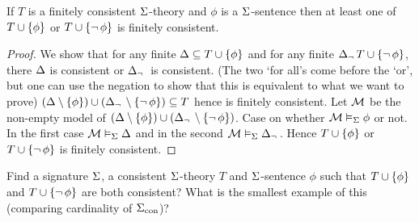 \begin{lem}
    If $T$ is a finitely consistent $\Sigma$-theory 
    and $\phi$ is a $\Sigma$-sentence then at least one of
    $T \cup \left\{\phi\right\}$ or $T \cup \left\{\neg\, \phi\right\}$ is finitely consistent.
\end{lem}
\begin{proof}
    We show that for any finite $\Delta \subseteq T \cup \left\{\phi\right\}$ and 
    for any finite $\Delta_\neg\, T \cup \left\{\neg\, \phi\right\}$,
    there $\Delta$ is consistent or $\Delta_\neg\,$ is consistent.
    (The two `for all's come before the `or', 
    but one can use the negation to show that this is 
    equivalent to what we want to prove)
    $(\Delta \setminus \left\{\phi\right\}) \cup 
    (\Delta_\neg\, \setminus \left\{\neg\, \phi\right\}) \subseteq T$ 
    hence is finitely consistent.
    Let $\mathcal{M}$ be the non-empty model of 
    $(\Delta \setminus \left\{\phi\right\}) \cup 
    (\Delta_\neg\, \setminus \left\{\neg\, \phi\right\})$.
    Case on whether $\mathcal{M} \vDash_{\Sigma} \phi$ or not.
    In the first case $\mathcal{M} \vDash_{\Sigma} \Delta$
    and in the second $\mathcal{M} \vDash_{\Sigma} \Delta_\neg\,$.
    Hence $T \cup \left\{\phi\right\}$ or $T \cup \left\{\neg\, \phi\right\}$ 
    is finitely consistent.
\end{proof}

\begin{ex}
    Find a signature $\Sigma$, a consistent $\Sigma$-theory $T$
    and $\Sigma$-sentence $\phi$ such that  
    $T \cup \left\{\phi\right\}$ and 
    $T \cup \left\{\neg\, \phi\right\}$ are both consistent?
    What is the smallest example 
    of this (comparing cardinality of ${\Sigma}_\mathrm{con}$)?
\end{ex}
    
